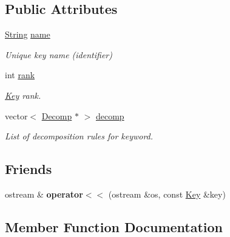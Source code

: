 \subsection*{Public Attributes}
\begin{DoxyCompactItemize}
\item 
\mbox{\label{classKey_a2e5239c4a662635b68778364afd46a96}} 
\mbox{\hyperlink{classString}{String}} \mbox{\hyperlink{classKey_a2e5239c4a662635b68778364afd46a96}{name}}
\begin{DoxyCompactList}\small\item\em Unique key name (identifier) \end{DoxyCompactList}\item 
\mbox{\label{classKey_ad960b9e4804c3cb039a816811bae4839}} 
int \mbox{\hyperlink{classKey_ad960b9e4804c3cb039a816811bae4839}{rank}}
\begin{DoxyCompactList}\small\item\em \mbox{\hyperlink{classKey}{Key}} rank. \end{DoxyCompactList}\item 
\mbox{\label{classKey_a48cc30fe4323cd4a0109bdca4c19efd5}} 
vector$<$ \mbox{\hyperlink{classDecomp}{Decomp}} $\ast$ $>$ \mbox{\hyperlink{classKey_a48cc30fe4323cd4a0109bdca4c19efd5}{decomp}}
\begin{DoxyCompactList}\small\item\em List of decomposition rules for keyword. \end{DoxyCompactList}\end{DoxyCompactItemize}
\subsection*{Friends}
\begin{DoxyCompactItemize}
\item 
\mbox{\label{classKey_a79dc2e19cc4e5d3e4e77d835513e89ca}} 
ostream \& {\bfseries operator$<$$<$} (ostream \&os, const \mbox{\hyperlink{classKey}{Key}} \&key)
\end{DoxyCompactItemize}


\subsection{Member Function Documentation}
\mbox{\label{classKey_ad1ee86395985a3b7e6715597c777eeec}} 
